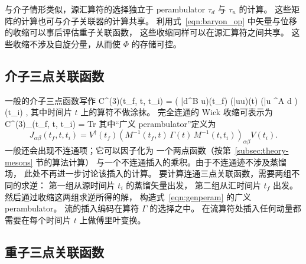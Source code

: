 与介子情形类似，源汇算符的选择独立于
perambulator $\tau_d$ 与 $\tau_u$ 的计算。
这些矩阵的计算也可与介子关联器的计算共享。
利用式~\ref{eqn:baryon_op} 中矢量与位移的收缩可以事后评估重子关联函数，
这些收缩同样可以在源汇算符之间共享。
这些收缩不涉及自旋分量，从而使 $\Phi$ 的存储可控。

\subsection{介子三点关联函数}\label{subsec:theory-mesons-3pt}

一般的介子三点函数写作
\beq
   C^{(3)}(t_f, t, t_i) = \Big\langle
\big( \bar{d}\Box \Gamma^B \Box u\big)(t_f) \cdot
\big(\bar{u}\Gamma u\big)(t) \cdot
\big(\bar{u} \Box \Gamma^A \Box d \big)(t_i)
\Big\rangle,
\eeq
其中时间片 $t$ 上的算符不做涂抹。
完全连通的 Wick 收缩可表示为
\beq
 C^{(3)}_{}(t_f, t, t_i) = \mbox{Tr}
\eeq
其中``广义 perambulator''定义为
\begin{equation}
J_{\alpha\beta}(t_f,t,t_i) =  V^\dag(t_f) \left( M^{-1}(t_f,t)\, \Gamma(t) \,
M^{-1}(t,t_i)  \right)_{\alpha\beta} V(t_i). \label{eqn:genperam}
\end{equation}
一般还会出现不连通项；它可以因子化为
一个两点函数（按第~\ref{subsec:theory-mesons} 节的算法计算）
与一个不连通插入的乘积。由于不连通迹不涉及蒸馏场，
此处不再进一步讨论该插入的计算。
要计算连通三点关联函数，需要两组不同的求逆：
第一组从源时间片 $t_i$ 的蒸馏矢量出发，
第二组从汇时间片 $t_f$ 出发。
然后通过收缩这两组求逆所得的解，
构造式~\ref{eqn:genperam} 的广义 perambulator。
流的插入编码在算符 $\Gamma$ 的选择之中。
在流算符处插入任何动量都需要在每个时间片 $t$ 上做傅里叶变换。

\subsection{重子三点关联函数}\label{subsec:theory-baryons-3pt}

